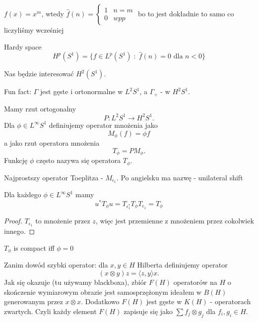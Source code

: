 \documentclass[12pt]{book}
\begin{document}
\begin{example}
  $f(x)=x^m$, wtedy $\hat{f}(n)=\begin{cases}1 & n=m\\0 & wpp\end{cases}$ bo to jest dokładnie to samo co liczyliśmy wcześniej 
\end{example}

\begin{definition}{Hardy space}{}
  $$H^p(S^1)=\{f\in L^p(S^1)\;:\;\hat{f}(n)=0\text{ dla }n<0\}$$
\end{definition}

Nas będzie interesować $H^2(S^1)$.

Fun fact: $\Gamma$ jest gęste i ortonormalne w $L^2S^1$, a $\Gamma_+$ - w $H^2S^1$.

Mamy rzut ortogonalny
$$P:L^2S^1\to H^2S^1.$$
Dla $\phi\in L^\infty S^1$ definiujemy operator mnożenia jako
$$M_\phi(f)=\phi f$$
a  jako rzut operatora mnożenia
$$T_\phi=PM_\phi.$$
Funkcję $\phi$ często nazywa się  operatora $T_\phi$.

\begin{example}
  Najprostszy operator Toeplitza - $M_{\epsilon_1}$. Po angielsku ma nazwę - unilateral shift
\end{example}

\begin{lemma}{}{}
  Dla każdego $\phi\in L^\infty S^1$ mamy
  $$u^*T_\phi u=T_{\epsilon_1^*}T_\phi T_{\epsilon_1}=T_\phi$$
\end{lemma}

\begin{proof}
  $T_{\epsilon_1}$ to mnożenie przez $z$, więc jest przemienne z mnożeniem przez cokolwiek innego. 
\end{proof}

\begin{lemma}{}{}
  $T_\phi$ is compact iff $\phi=0$
\end{lemma}

Zanim dowód szybki operator: dla $x,y\in H$ Hilberta definiujemy operator
$$(x\otimes y)z=\langle z,y\rangle x.$$
Jak się okazuje (tu używamy blackboxa), zbiór $F(H)$ operatorów na $H$ o skończenie wymiarowym obrazie jest samosprzężonym ideałem w $B(H)$ generowanym przez $x\otimes x$. Dodatkowo $F(H)$ jest gęste w $K(H)$ - operatorach zwartych. Czyli każdy element $F(H)$ zapisuje się jako $\sum f_j\otimes g_j$ dla $f_i,g_i\in H$.
\end{document}
